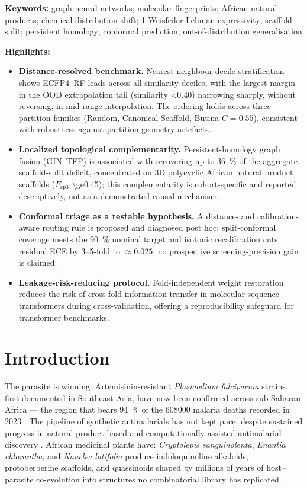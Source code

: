 \documentclass[11pt,a4paper]{article}
\begin{document}
\noindent\textbf{Keywords:} graph neural networks; molecular fingerprints; African natural products; chemical distribution shift; 1-Weisfeiler-Lehman expressivity; scaffold split; persistent homology; conformal prediction; out-of-distribution generalisation

\noindent\textbf{Highlights:}
\begin{itemize}
\item \textbf{Distance-resolved benchmark.} Nearest-neighbour decile stratification shows ECFP4--RF leads across all similarity deciles, with the largest margin in the OOD extrapolation tail (similarity \num{<0.40}) narrowing sharply, without reversing, in mid-range interpolation. The ordering holds across three partition families (Random, Canonical Scaffold, Butina $C=\num{0.55}$), consistent with robustness against partition-geometry artefacts.
\item \textbf{Localized topological complementarity.} Persistent-homology graph fusion (GIN--TFP) is associated with recovering up to \qty{36}{\percent} of the aggregate scaffold-split deficit, concentrated on 3D polycyclic African natural product scaffolds ($F_{\mathrm{sp3}}$ \num{\ge0.45}); this complementarity is cohort-specific and reported descriptively, not as a demonstrated causal mechanism.
\item \textbf{Conformal triage as a testable hypothesis.} A distance- and calibration-aware routing rule is proposed and diagnosed post hoc: split-conformal coverage meets the \qty{90}{\percent} nominal target and isotonic recalibration cuts residual ECE by \numrange{3}{5}-fold to $\approx\num{0.025}$; no prospective screening-precision gain is claimed.
\item \textbf{Leakage-risk-reducing protocol.} Fold-independent weight restoration reduces the risk of cross-fold information transfer in molecular sequence transformers during cross-validation, offering a reproducibility safeguard for transformer benchmarks.
\end{itemize}


\section{Introduction}

The parasite is winning. Artemisinin-resistant \emph{Plasmodium falciparum} strains, first documented in Southeast Asia, have now been confirmed across sub-Saharan Africa --- the region that bears \qty{94}{\percent} of the \num{608000} malaria deaths recorded in 2023 \citep{who2024malariareport,ariyey2014,ashley2018}. The pipeline of synthetic antimalarials has not kept pace, despite sustained progress in natural-product-based and computationally assisted antimalarial discovery \citep{tandfonline2026antimalarialreview,ferreira2021qsar,mbahbake2025pfldh}. African medicinal plants have: \emph{Cryptolepis sanguinolenta}, \emph{Enantia chlorantha}, and \emph{Nauclea latifolia} produce indoloquinoline alkaloids, protoberberine scaffolds, and quassinoids shaped by millions of years of host--parasite co-evolution into structures no combinatorial library has replicated.
\end{document}
